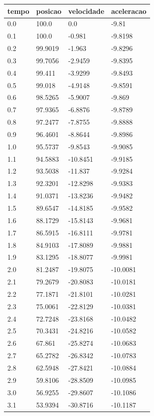 \begin{tabular}{llll}
\toprule
tempo & posicao & velocidade & aceleracao \\
\midrule
0.0 & 100.0 & 0.0 & -9.81 \\
0.1 & 100.0 & -0.981 & -9.8198 \\
0.2 & 99.9019 & -1.963 & -9.8296 \\
0.3 & 99.7056 & -2.9459 & -9.8395 \\
0.4 & 99.411 & -3.9299 & -9.8493 \\
0.5 & 99.018 & -4.9148 & -9.8591 \\
0.6 & 98.5265 & -5.9007 & -9.869 \\
0.7 & 97.9365 & -6.8876 & -9.8789 \\
0.8 & 97.2477 & -7.8755 & -9.8888 \\
0.9 & 96.4601 & -8.8644 & -9.8986 \\
1.0 & 95.5737 & -9.8543 & -9.9085 \\
1.1 & 94.5883 & -10.8451 & -9.9185 \\
1.2 & 93.5038 & -11.837 & -9.9284 \\
1.3 & 92.3201 & -12.8298 & -9.9383 \\
1.4 & 91.0371 & -13.8236 & -9.9482 \\
1.5 & 89.6547 & -14.8185 & -9.9582 \\
1.6 & 88.1729 & -15.8143 & -9.9681 \\
1.7 & 86.5915 & -16.8111 & -9.9781 \\
1.8 & 84.9103 & -17.8089 & -9.9881 \\
1.9 & 83.1295 & -18.8077 & -9.9981 \\
2.0 & 81.2487 & -19.8075 & -10.0081 \\
2.1 & 79.2679 & -20.8083 & -10.0181 \\
2.2 & 77.1871 & -21.8101 & -10.0281 \\
2.3 & 75.0061 & -22.8129 & -10.0381 \\
2.4 & 72.7248 & -23.8168 & -10.0482 \\
2.5 & 70.3431 & -24.8216 & -10.0582 \\
2.6 & 67.861 & -25.8274 & -10.0683 \\
2.7 & 65.2782 & -26.8342 & -10.0783 \\
2.8 & 62.5948 & -27.8421 & -10.0884 \\
2.9 & 59.8106 & -28.8509 & -10.0985 \\
3.0 & 56.9255 & -29.8607 & -10.1086 \\
3.1 & 53.9394 & -30.8716 & -10.1187 \\

\end{tabular}

